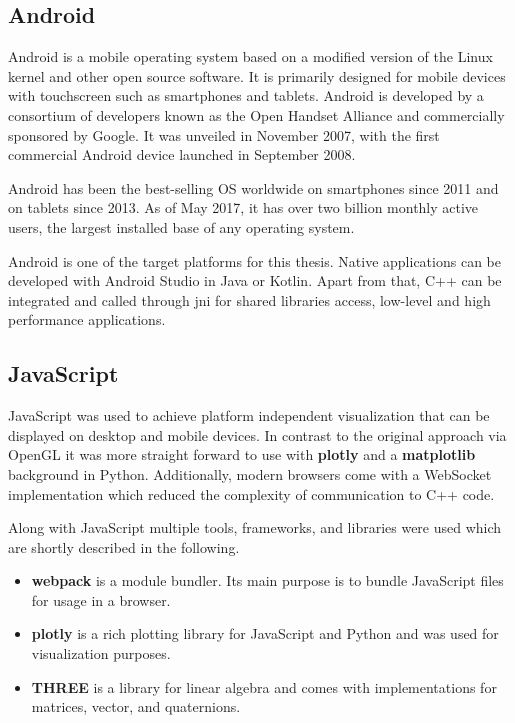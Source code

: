 \subsection{Android}

Android is a mobile operating system based on a modified version of the Linux kernel and other open source software. It is primarily designed for mobile devices with touchscreen such as smartphones and tablets. Android is developed by a consortium of developers known as the Open Handset Alliance and commercially sponsored by Google. It was unveiled in November 2007, with the first commercial Android device launched in September 2008.

Android has been the best-selling OS worldwide on smartphones since 2011 and on tablets since 2013. As of May 2017, it has over two billion monthly active users, the largest installed base of any operating system.

Android is one of the target platforms for this thesis. Native applications can be developed with Android Studio in Java or Kotlin. Apart from that, C++ can be integrated and called through \gls{jni} for shared libraries access, low-level and high performance applications.

\subsection{JavaScript}

JavaScript was used to achieve platform independent visualization that can be displayed on desktop and mobile devices. In contrast to the original approach via OpenGL it was more straight forward to use with \textbf{plotly} and a \textbf{matplotlib} background in Python. Additionally, modern browsers come with a WebSocket implementation which reduced the complexity of communication to C++ code.

Along with JavaScript multiple tools, frameworks, and libraries were used which are shortly described in the following.
\begin{itemize}
  \item \textbf{webpack} is a module bundler. Its main purpose is to bundle JavaScript files for usage in a browser.
  \item \textbf{plotly} is a rich plotting library for JavaScript and Python and was used for visualization purposes.
  \item \textbf{THREE} is a library for linear algebra and comes with implementations for matrices, vector, and quaternions.
\end{itemize}

